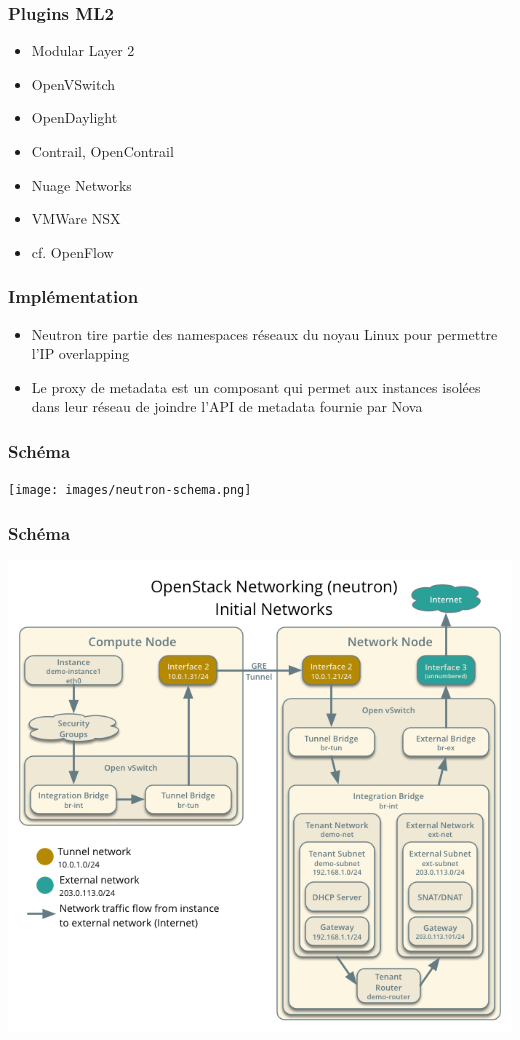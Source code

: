   \begin{frame}
    \frametitle{Plugins ML2}
    \begin{itemize}
      \item Modular Layer 2
      \item OpenVSwitch
      \item OpenDaylight
      \item Contrail, OpenContrail
      \item Nuage Networks
      \item VMWare NSX
      \item cf. OpenFlow
    \end{itemize}
  \end{frame}

  \begin{frame}
    \frametitle{Implémentation}
    \begin{itemize}
      \item Neutron tire partie des namespaces réseaux du noyau Linux pour permettre l'IP overlapping
      \item Le proxy de metadata est un composant qui permet aux instances isolées dans leur réseau de joindre l'API de metadata fournie par Nova
    \end{itemize}
  \end{frame}

  \begin{frame}
    \frametitle{Schéma}
    \texttt{[image: images/neutron-schema.png]}
  \end{frame}

  \begin{frame}
    \frametitle{Schéma}
    \includegraphics[width=\textwidth,height=\textheight]{images/neutron-schema2.png}
  \end{frame}

